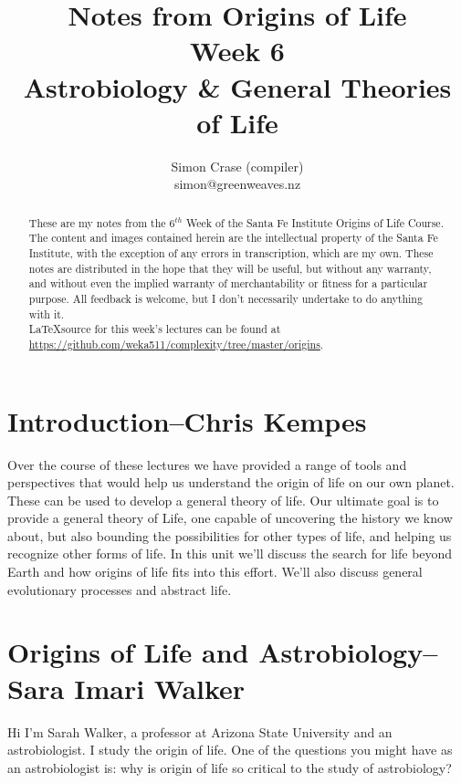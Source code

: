 \documentclass[]{article}
\title{
	Notes from Origins of Life\\
	Week 6\\
	 Astrobiology \& General Theories of Life
}
\author{Simon Crase (compiler)\\simon@greenweaves.nz}
\begin{document}
\maketitle

\begin{abstract}
   These are my notes from the $6^{th}$ Week of the Santa Fe Institute Origins of Life Course\cite{sfi2020}. 
   The content and images contained herein are the intellectual property of the Santa Fe Institute, with the exception of any errors in transcription, which are my own.
   These notes are distributed in the hope that they will be useful,
   but without any warranty, and without even the implied warranty of
   merchantability or fitness for a particular purpose. All feedback is welcome,
   but I don't necessarily undertake to do anything with it.\\
   \LaTeX source for this week's lectures can be found at\\
   \url{https://github.com/weka511/complexity/tree/master/origins}.
\end{abstract}

\setcounter{tocdepth}{2}
\tableofcontents

\listoffigures

\section[Introduction]{Introduction--Chris Kempes}

Over the course of these lectures we have provided a range of tools and perspectives that would help us understand the origin of life on our own planet. These can be used to develop a general theory of life. Our ultimate goal is to provide a general theory of Life, one capable of uncovering the history we know about, but also bounding the possibilities for other types of life, and helping us recognize other forms of life. In this unit we'll discuss the search for life beyond Earth and how origins of life fits into this effort. We'll also discuss general evolutionary processes and abstract life. 

\section[Origins of Life and Astrobiology]{Origins of Life and Astrobiology-- Sara Imari Walker}

Hi I'm Sarah Walker, a professor at Arizona State University and an astrobiologist.
I study the origin of life. One of the questions you might have as an astrobiologist is: why is origin of life so critical to the study of astrobiology?
\end{document}

